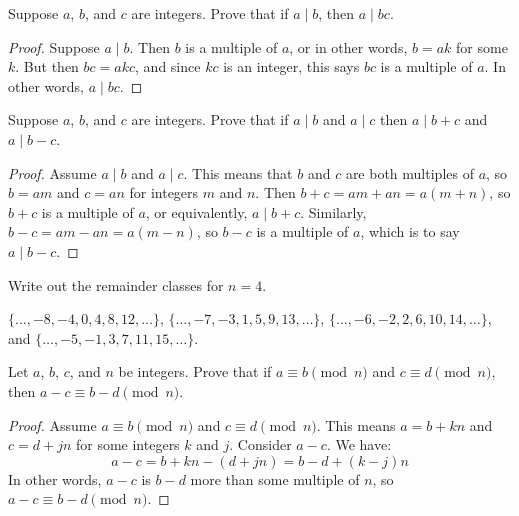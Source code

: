 
\begin{questions}
\question Suppose $a$, $b$, and $c$ are integers.  Prove that if $a \mid b$, then $a \mid bc$.

	\begin{answer}
		\begin{proof}
			Suppose $a \mid b$.  Then $b$ is a multiple of $a$, or in other words, $b = ak$ for some $k$.  But then $bc = akc$, and since $kc$ is an integer, this says $bc$ is a multiple of $a$.  In other words, $a \mid bc$.
		\end{proof}
	\end{answer}
	
	
	
	
	

\question Suppose $a$, $b$, and $c$ are integers.  Prove that if $a \mid b$ and $a \mid c$ then $a \mid b+c$ and $a \mid b-c$.

	\begin{answer}
		\begin{proof}
			Assume $a \mid b$ and $a \mid c$.  This means that $b$ and $c$ are both multiples of $a$, so $b = am$ and $c = an$ for integers $m$ and $n$.  Then $b+c = am+an = a(m+n)$, so $b+c$ is a multiple of $a$, or equivalently, $a \mid b+c$.  Similarly, $b-c = am-an = a(m-n)$, so $b-c$ is a multiple of $a$, which is to say $a \mid b-c$.
		\end{proof}
	\end{answer}
	






\question Write out the remainder classes for $n = 4$.

	\begin{answer}
		$\{\ldots, -8, -4, 0, 4, 8, 12, \ldots\}$, $\{\ldots, -7, -3, 1, 5, 9, 13, \ldots\}$, $\{\ldots, -6, -2, 2, 6, 10, 14, \ldots\}$, and $\{\ldots, -5, -1, 3, 7, 11, 15, \ldots\}$.
	\end{answer}
	
	





\question Let $a$, $b$, $c$, and $n$ be integers.  Prove that if $a \equiv b \pmod{n}$ and $c \equiv d \pmod{n}$, then $a-c \equiv b-d \pmod{n}$.

	\begin{answer}
		\begin{proof}
			Assume $a \equiv b \pmod n$ and $c \equiv d \pmod n$.  This means $a = b + kn$ and $c = d + jn$ for some integers $k$ and $j$.  Consider $a-c$.  We have:
			\[a-c = b+kn - (d+jn) = b-d + (k-j)n\]
			In other words, $a-c$ is $b-d$ more than some multiple of $n$, so $a-c \equiv b-d \pmod n$.
		\end{proof}
	\end{answer}	
	






\end{questions}
